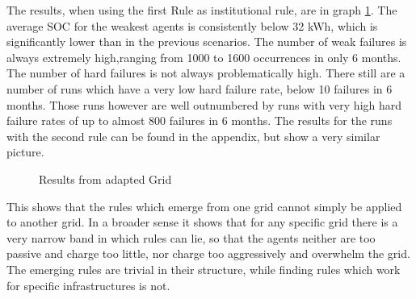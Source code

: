 \documentclass[a4paper]{article}
\begin{document}
The results, when using the first Rule as institutional rule,  are in graph \ref{Result_exp_5}. The average SOC for the weakest agents 
is consistently below 32 kWh, which is significantly lower than in the previous scenarios. The number of weak failures is always 
extremely high,ranging from 1000 to 1600 occurrences in only 6 months. 
The number of hard failures is not always problematically high. There still are a number of runs which have a very low hard 
failure rate, below 10 failures in 6 months. Those runs however are well outnumbered by runs with very high hard failure rates of up to 
almost 800 failures in 6 months.
The results for the runs with the second rule can be found in the appendix, but show a very similar picture.  

\begin{figure}[!ht]
\caption{Results from adapted Grid}
\label{Result_exp_5}
\end{figure}
This shows that the rules which emerge from one grid cannot simply
be applied to another grid. In a broader sense it shows that for any specific grid there is a very narrow band in which rules can lie, 
so that the agents neither are too passive and charge too little, nor charge too aggressively and overwhelm the grid. The emerging rules
are trivial in their structure, while finding rules which work for specific infrastructures is not.
\end{document}
